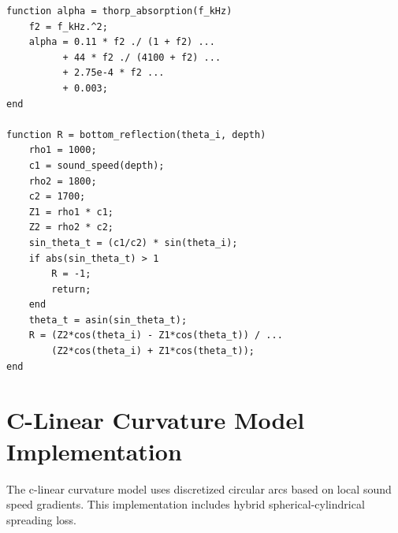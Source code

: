 \documentclass[fleqn]{jaes}
\begin{document}
\begin{verbatim}
function alpha = thorp_absorption(f_kHz)
    f2 = f_kHz.^2;
    alpha = 0.11 * f2 ./ (1 + f2) ...
          + 44 * f2 ./ (4100 + f2) ...
          + 2.75e-4 * f2 ...
          + 0.003;
end

function R = bottom_reflection(theta_i, depth)
    rho1 = 1000;
    c1 = sound_speed(depth);
    rho2 = 1800;
    c2 = 1700;
    Z1 = rho1 * c1;
    Z2 = rho2 * c2;
    sin_theta_t = (c1/c2) * sin(theta_i);
    if abs(sin_theta_t) > 1
        R = -1;
        return;
    end
    theta_t = asin(sin_theta_t);
    R = (Z2*cos(theta_i) - Z1*cos(theta_t)) / ...
        (Z2*cos(theta_i) + Z1*cos(theta_t));
end
\end{verbatim}

\section{C-Linear Curvature Model Implementation}

The c-linear curvature model uses discretized circular arcs based on local sound speed gradients. This implementation includes hybrid spherical-cylindrical spreading loss.
\end{document}
